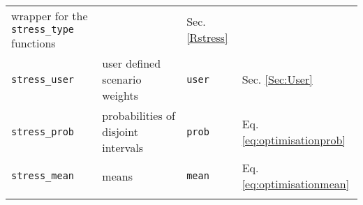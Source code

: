 \documentclass[
]{article}
\begin{document}
\begin{longtable}[]{@{}llll@{}}
\begin{minipage}[t]{0.39\columnwidth}
wrapper for the \texttt{stress\_type} functions\strut
\end{minipage} & \begin{minipage}[t]{0.09\columnwidth}\raggedright
\strut
\end{minipage} & \begin{minipage}[t]{0.20\columnwidth}\raggedright
Sec. \ref{Rstress}\strut
\end{minipage}\tabularnewline
\begin{minipage}[t]{0.20\columnwidth}\raggedright
\texttt{stress\_user}\strut
\end{minipage} & \begin{minipage}[t]{0.39\columnwidth}\raggedright
user defined scenario weights\strut
\end{minipage} & \begin{minipage}[t]{0.09\columnwidth}\raggedright
\texttt{user}\strut
\end{minipage} & \begin{minipage}[t]{0.20\columnwidth}\raggedright
Sec. \ref{Sec:User}\strut
\end{minipage}\tabularnewline
\begin{minipage}[t]{0.20\columnwidth}\raggedright
\texttt{stress\_prob}\strut
\end{minipage} & \begin{minipage}[t]{0.39\columnwidth}\raggedright
probabilities of disjoint intervals\strut
\end{minipage} & \begin{minipage}[t]{0.09\columnwidth}\raggedright
\texttt{prob}\strut
\end{minipage} & \begin{minipage}[t]{0.20\columnwidth}\raggedright
Eq. \eqref{eq:optimisationprob}\strut
\end{minipage}\tabularnewline
\begin{minipage}[t]{0.20\columnwidth}\raggedright
\texttt{stress\_mean}\strut
\end{minipage} & \begin{minipage}[t]{0.39\columnwidth}\raggedright
means\strut
\end{minipage} & \begin{minipage}[t]{0.09\columnwidth}\raggedright
\texttt{mean}\strut
\end{minipage} & \begin{minipage}[t]{0.20\columnwidth}\raggedright
Eq. \eqref{eq:optimisationmean}\strut
\end{minipage}\tabularnewline
\begin{minipage}[t]{0.20\columnwidth}\raggedright

\end{minipage}
\end{longtable}
\end{document}
